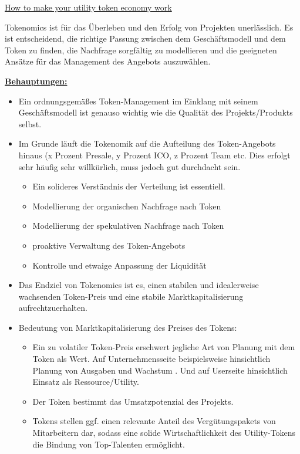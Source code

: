\begin{Zitat*}

\href{https://blog.stobox.io/how-to-make-your-utility-token-economy-work/}{How to make your utility token economy work}

\vspace{0.2cm}

Tokenomics ist für das Überleben und den Erfolg von Projekten unerlässlich. Es ist entscheidend, die richtige Passung zwischen dem Geschäftsmodell und dem Token zu finden, die Nachfrage sorgfältig zu modellieren und die geeigneten Ansätze für das Management des Angebots auszuwählen. 

\vspace{0.2cm}

\underline{\textbf{Behauptungen:}}

\begin{itemize}
  \item Ein ordnungsgemäßes Token-Management im Einklang mit seinem Geschäftsmodell ist genauso wichtig wie die Qualität des Projekts/Produkts selbst.
  \item Im Grunde läuft die Tokenomik auf die Aufteilung des Token-Angebots hinaus (x Prozent Presale, y Prozent ICO, z Prozent Team etc. Dies erfolgt sehr häufig sehr willkürlich, muss jedoch gut durchdacht sein.
  \begin{itemize}
  	\item Ein solideres Verständnis der Verteilung ist essentiell.
  	\item Modellierung der organischen Nachfrage nach Token
  	\item Modellierung der spekulativen Nachfrage nach Token
  	\item proaktive Verwaltung des Token-Angebots
  	\item Kontrolle und etwaige Anpassung der Liquidität
  \end{itemize}
  \item Das Endziel von Tokenomics ist es, einen stabilen und idealerweise wachsenden Token-Preis und eine stabile Marktkapitalisierung aufrechtzuerhalten.
  \item Bedeutung von Marktkapitalisierung des Preises des Tokens:
  \begin{itemize}
  	\item Ein zu volatiler Token-Preis erschwert jegliche Art von Planung mit dem Token als Wert. Auf Unternehmensseite beispielsweise hinsichtlich Planung von Ausgaben und Wachstum . Und auf Userseite hinsichtlich Einsatz als Ressource/Utility.
  	\item Der Token bestimmt das Umsatzpotenzial des Projekts.
  	\item Tokens stellen ggf. einen relevante Anteil des Vergütungspakets von Mitarbeitern dar, sodass eine solide Wirtschaftlichkeit des Utility-Tokens die Bindung von Top-Talenten ermöglicht. 
  \end{itemize}
\end{itemize}


\end{Zitat*}
